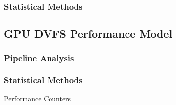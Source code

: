 \subsubsection{Statistical Methods}

\subsection{GPU DVFS Performance Model}
\label{section:powermodels}
\subsubsection{Pipeline Analysis}
\subsubsection{Statistical Methods}
Performance Counters

